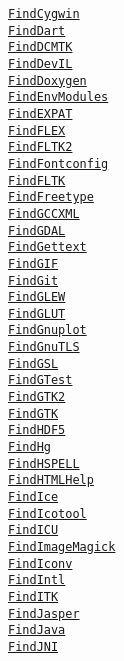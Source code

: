\documentclass{article}
\newcommand{\cmakemodule}[1]{{\href{https://cmake.org/cmake/help/v3.20/module/#1.html}{{\lstinline{#1}}}}}
\begin{document}
\begin{minipage}[t]{0.18\linewidth}
\cmakemodule{FindCygwin}\\
\cmakemodule{FindDart}\\
\cmakemodule{FindDCMTK}\\
\cmakemodule{FindDevIL}\\
\cmakemodule{FindDoxygen}\\
\cmakemodule{FindEnvModules}\\
\cmakemodule{FindEXPAT}\\
\cmakemodule{FindFLEX}\\
\cmakemodule{FindFLTK2}\\
\cmakemodule{FindFontconfig}\\
\cmakemodule{FindFLTK}\\
\cmakemodule{FindFreetype}\\
\cmakemodule{FindGCCXML}\\
\cmakemodule{FindGDAL}\\
\cmakemodule{FindGettext}\\
\cmakemodule{FindGIF}\\
\cmakemodule{FindGit}\\
\cmakemodule{FindGLEW}\\
\cmakemodule{FindGLUT}\\
\cmakemodule{FindGnuplot}\\
\cmakemodule{FindGnuTLS}\\
\cmakemodule{FindGSL}\\
\cmakemodule{FindGTest}\\
\cmakemodule{FindGTK2}\\
\cmakemodule{FindGTK}\\
\cmakemodule{FindHDF5}\\
\cmakemodule{FindHg}\\
\cmakemodule{FindHSPELL}\\
\cmakemodule{FindHTMLHelp}\\
\cmakemodule{FindIce}\\
\cmakemodule{FindIcotool}\\
\cmakemodule{FindICU}\\
\cmakemodule{FindImageMagick}\\
\cmakemodule{FindIconv}\\
\cmakemodule{FindIntl}\\
\cmakemodule{FindITK}\\
\cmakemodule{FindJasper}\\
\cmakemodule{FindJava}\\
\cmakemodule{FindJNI}\\

\end{minipage}
\end{document}
